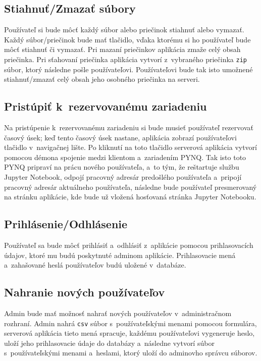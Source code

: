 \subsection{Stiahnuť/Zmazať súbory}

Používateľ si bude môcť každý súbor alebo priečinok stiahnuť alebo vymazať. Každý súbor/priečinok bude mať tlačidlo, vďaka ktorému si ho používateľ bude môcť stiahnuť či vymazať. Pri mazaní priečinkov aplikácia zmaže celý obsah priečinka. Pri sťahovaní priečinka aplikácia vytvorí z~vybraného priečinka \verb|zip| súbor, ktorý následne pošle používateľovi. Používateľovi bude tak isto umožnené stiahnuť/zmazať celý obsah jeho osobného priečinka na serveri.

\subsection{Pristúpiť k~rezervovanému zariadeniu}

Na pristúpenie k~rezervovanému zariadeniu si bude musieť používateľ rezervovať časový úsek; keď tento časový úsek nastane, aplikácia zobrazí používateľovi tlačidlo v~navigačnej lište. Po kliknutí na toto tlačidlo serverová aplikácia vytvorí pomocou démona spojenie medzi klientom a~zariadením PYNQ. Tak isto toto PYNQ pripraví na prácu nového používateľa, a~to tým, že reštartuje službu Jupyter Notebook, odpojí pracovný adresár predošlého používateľa a~pripojí pracovný adresár aktuálneho používateľa, následne bude používateľ presmerovaný na stránku aplikácie, kde bude už vložená hosťovaná stránka Jupyter Notebooku.

\subsection{Prihlásenie/Odhlásenie}

Používateľ sa bude môcť prihlásiť a~odhlásiť z~aplikácie pomocou prihlasovacích údajov, ktoré mu budú poskytnuté adminom aplikácie. Prihlasovacie mená a~zahašované heslá používateľov budú uložené v~databáze.

\subsection{Nahranie nových používateľov} 

Admin bude mať možnosť nahrať nových používateľov v~administračnom rozhraní. Admin nahrá \verb|csv| súbor s~používateľskými menami pomocou formulára, serverová aplikácia tieto mená spracuje, každému používateľovi vygeneruje heslo, uloží jeho prihlasovacie údaje do databázy a~následne vytvorí súbor s~používateľskými menami a~heslami, ktorý uloží do adminovho správcu súborov.

